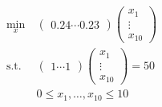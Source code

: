 \documentclass[preview]{standalone}
\begin{document}
\begin{align*}
\begin{aligned}\min_{x} &\ \begin{pmatrix} 0.24 \cdots 0.23 \end{pmatrix} \begin{pmatrix} x_1\\ \vdots\\ x_{10} \end{pmatrix} \\\text{s.t.} &\ \begin{pmatrix} 1 \cdots 1 \end{pmatrix} \begin{pmatrix} x_1\\ \vdots\\ x_{10} \end{pmatrix} = 50 \\&\ 0 \leq x_1, \ldots , x_{10} \leq 10 \end{aligned}
\end{align*}
\end{document}
